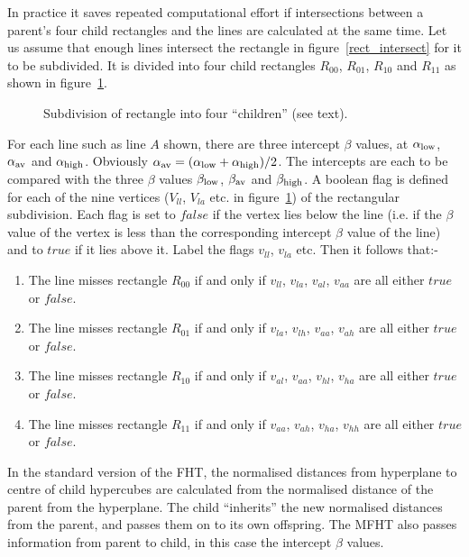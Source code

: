  In practice it saves repeated computational effort if intersections between
 a parent's four child rectangles and the lines are calculated at the same
 time. Let us assume that enough lines intersect the rectangle in
 figure~\ref{rect_intersect} for it to be subdivided.
 It is divided into four child rectangles $R_{00}$, $R_{01}$, $R_{10}$
 and $R_{11}$ as shown in figure~\ref{rect_divide}.
 \begin{figure}
  \centerline{}
  \caption[Subdivision of rectangle into four ``children''.]
	  {Subdivision of rectangle into four ``children'' (see text).}
  \label{rect_divide}
 \end{figure}
 For each line such as line $A$ shown, there are three intercept $\beta$
 values, at $\alpha_{\rm low}$, $\alpha_{\rm av}$ and $\alpha_{\rm high}$.
 Obviously $\alpha_{\rm av} = (\alpha_{\rm low} + \alpha_{\rm high})/2$.
 The intercepts are each to be compared with
 the three $\beta$ values $\beta_{\rm low}$,
 $\beta_{\rm av}$ and $\beta_{\rm high}$. A boolean flag is defined for each of
 the nine vertices ($V_{ll}$, $V_{la}$ etc. in figure~\ref{rect_divide})
 of the rectangular subdivision. Each flag is set to
 $false$ if the vertex lies below the line (i.e. if the $\beta$ value
 of the vertex is less than the corresponding intercept $\beta$ value of
 the line) and to $true$ if it lies above it. Label the flags
 $v_{ll}$, $v_{la}$ etc. Then it follows that:-
 \begin{enumerate}
  \item The line misses rectangle $R_{00}$ if and only if
	$v_{ll}$, $v_{la}$, $v_{al}$, $v_{aa}$
	are all either $true$ or $false$.

  \item The line misses rectangle $R_{01}$ if and only if
	$v_{la}$, $v_{lh}$, $v_{aa}$, $v_{ah}$
	are all either $true$ or $false$.

  \item The line misses rectangle $R_{10}$ if and only if
	$v_{al}$, $v_{aa}$, $v_{hl}$, $v_{ha}$
	are all either $true$ or $false$.

  \item The line misses rectangle $R_{11}$ if and only if
	$v_{aa}$, $v_{ah}$, $v_{ha}$, $v_{hh}$
	are all either $true$ or $false$.
 \end{enumerate}

 In the standard version of the FHT, the normalised distances from hyperplane
 to centre of child hypercubes are calculated from the normalised distance
 of the parent from the hyperplane. The child ``inherits'' the new normalised
 distances from the parent, and passes them on to its own offspring.
 The MFHT also passes information from parent to child, in this case
 the intercept $\beta$ values.
